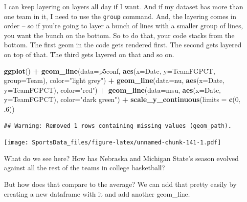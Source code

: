 \documentclass[]{book}
\newenvironment{Shaded}{\begin{snugshade}}{\end{snugshade}}
\newcommand{\KeywordTok}[1]{\textcolor[rgb]{0.13,0.29,0.53}{\textbf{#1}}}
\newcommand{\DataTypeTok}[1]{\textcolor[rgb]{0.13,0.29,0.53}{#1}}
\newcommand{\DecValTok}[1]{\textcolor[rgb]{0.00,0.00,0.81}{#1}}
\newcommand{\StringTok}[1]{\textcolor[rgb]{0.31,0.60,0.02}{#1}}
\newcommand{\OperatorTok}[1]{\textcolor[rgb]{0.81,0.36,0.00}{\textbf{#1}}}
\newcommand{\NormalTok}[1]{#1}
\begin{document}
I can keep layering on layers all day if I want. And if my dataset has
more than one team in it, I need to use the \texttt{group} command. And,
the layering comes in order -- so if you're going to layer a bunch of
lines with a smaller group of lines, you want the bunch on the bottom.
So to do that, your code stacks from the bottom. The first geom in the
code gets rendered first. The second gets layered on top of that. The
third gets layered on that and so on.

\begin{Shaded}
\begin{Highlighting}[]
\KeywordTok{ggplot}\NormalTok{() }\OperatorTok{+}\StringTok{ }\KeywordTok{geom_line}\NormalTok{(}\DataTypeTok{data=}\NormalTok{p5conf, }\KeywordTok{aes}\NormalTok{(}\DataTypeTok{x=}\NormalTok{Date, }\DataTypeTok{y=}\NormalTok{TeamFGPCT, }\DataTypeTok{group=}\NormalTok{Team), }\DataTypeTok{color=}\StringTok{"light grey"}\NormalTok{) }\OperatorTok{+}\StringTok{ }\KeywordTok{geom_line}\NormalTok{(}\DataTypeTok{data=}\NormalTok{nu, }\KeywordTok{aes}\NormalTok{(}\DataTypeTok{x=}\NormalTok{Date, }\DataTypeTok{y=}\NormalTok{TeamFGPCT), }\DataTypeTok{color=}\StringTok{"red"}\NormalTok{) }\OperatorTok{+}\StringTok{ }\KeywordTok{geom_line}\NormalTok{(}\DataTypeTok{data=}\NormalTok{msu, }\KeywordTok{aes}\NormalTok{(}\DataTypeTok{x=}\NormalTok{Date, }\DataTypeTok{y=}\NormalTok{TeamFGPCT), }\DataTypeTok{color=}\StringTok{"dark green"}\NormalTok{) }\OperatorTok{+}\StringTok{ }\KeywordTok{scale_y_continuous}\NormalTok{(}\DataTypeTok{limits =} \KeywordTok{c}\NormalTok{(}\DecValTok{0}\NormalTok{, .}\DecValTok{6}\NormalTok{))}
\end{Highlighting}
\end{Shaded}

\begin{verbatim}
## Warning: Removed 1 rows containing missing values (geom_path).
\end{verbatim}

\texttt{[image: SportsData\_files/figure-latex/unnamed-chunk-141-1.pdf]}

What do we see here? How has Nebraska and Michigan State's season
evolved against all the rest of the teams in college basketball?

But how does that compare to the average? We can add that pretty easily
by creating a new dataframe with it and add another geom\_line.

\begin{Shaded}
\end{Shaded}
\end{document}
